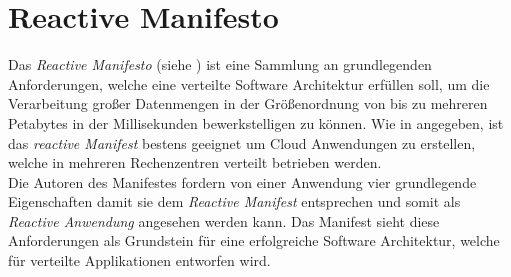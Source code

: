 \section{Reactive Manifesto}
\label{reactiveManifesto}
Das \textit{Reactive Manifesto} (siehe \cite{reactiveManifesto}) ist eine Sammlung an grundlegenden Anforderungen, welche eine verteilte Software Architektur erfüllen soll, um die Verarbeitung großer Datenmengen in der Größenordnung von bis zu mehreren Petabytes in der Millisekunden bewerkstelligen zu können. 
Wie in \cite{reactiveManifesto} angegeben, ist das \textit{reactive Manifest} bestens geeignet um Cloud Anwendungen zu erstellen, welche in mehreren Rechenzentren verteilt betrieben werden. \\
Die Autoren des Manifestes fordern von einer Anwendung vier grundlegende Eigenschaften damit sie dem \textit{Reactive Manifest} entsprechen und somit als \textit{Reactive Anwendung} angesehen werden kann. Das Manifest sieht diese Anforderungen als Grundstein für eine erfolgreiche Software Architektur, welche für verteilte Applikationen entworfen wird. 
